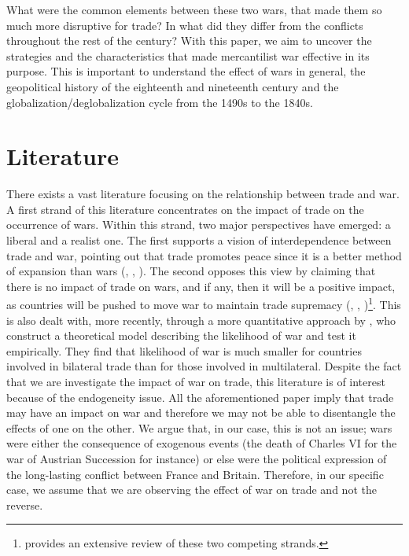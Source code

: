 \documentclass[12pt,a4paper,notitlepage,english]{article}
\newcommand{\source}[1]{\caption*{\footnotesize Source: {#1}} }
\begin{document}
What were the common elements between these two wars, that made them so much more disruptive for trade? In what did they differ from the conflicts throughout the rest of the century? With this paper, we aim to uncover the strategies and the characteristics that made mercantilist war effective in its purpose.
This is important to understand the effect of wars in general, the geopolitical history of the eighteenth and nineteenth century and the globalization/deglobalization cycle from the 1490s to the 1840s.

\section{Literature} \label{literature}
There exists a vast literature focusing on the relationship between trade and war.
A first strand of this literature concentrates on the impact of trade on the occurrence of wars.
Within this strand, two major perspectives have emerged: a liberal and a realist one.
The first supports a vision of interdependence between trade and war, pointing out that trade promotes peace since it is a better method of expansion than wars (\cite{Doyle1997}, \cite{Oneal1997}, \cite{Polachek1980}).
The second opposes this view by claiming that there is no impact of trade on wars, and if any, then it will be a positive impact, as countries will be pushed to move war to maintain trade supremacy (\cite{Ripsman1996}, \cite{Levy1990}, \cite{Buzan1984})\footnote{\cite{Mcmillan1997} provides an extensive review of these two competing strands.}.
This is also dealt with, more recently, through a more quantitative approach by \cite{Martin2008}, who construct a theoretical model describing the likelihood of war and test it empirically.
They find that likelihood of war is much smaller for countries involved in bilateral trade than for those involved in multilateral.
Despite the fact that we are investigate the impact of war on trade, this literature is of interest because of the endogeneity issue.
All the aforementioned paper imply that trade may have an impact on war and therefore we may not be able to disentangle the effects of one on the other.
We argue that, in our case, this is not an issue; wars were either the consequence of exogenous events (the death of Charles VI for the war of Austrian Succession for instance) or else were the political expression of the long-lasting conflict between France and Britain.
Therefore, in our specific case, we assume that we are observing the effect of war on trade and not the reverse.\\
\end{document}

